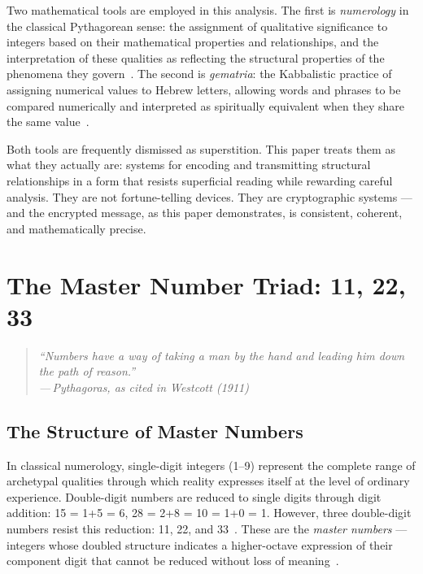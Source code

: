 \documentclass[12pt, a4paper]{article}
\newcommand{\epigraph}[2]{%
  \begin{quote}
    \itshape ``#1''\\[0.3em]
    \normalfont\small\hfill ---\,#2
  \end{quote}
}
\begin{document}
Two mathematical tools are employed in this analysis. The first is
\emph{numerology} in the classical Pythagorean sense: the assignment of
qualitative significance to integers based on their mathematical properties
and relationships, and the interpretation of these qualities as reflecting
the structural properties of the phenomena they
govern~\autocite{westcott1911}. The second is \emph{gematria}: the
Kabbalistic practice of assigning numerical values to Hebrew letters,
allowing words and phrases to be compared numerically and interpreted as
spiritually equivalent when they share the same
value~\autocite{blumenthal2006}.

Both tools are frequently dismissed as superstition. This paper treats them as
what they actually are: systems for encoding and transmitting structural
relationships in a form that resists superficial reading while rewarding
careful analysis. They are not fortune-telling devices. They are
cryptographic systems — and the encrypted message, as this paper demonstrates,
is consistent, coherent, and mathematically precise.

\section{The Master Number Triad: 11, 22, 33}
\label{sec:master}

\epigraph{Numbers have a way of taking a man by the hand and leading him down
the path of reason.}{Pythagoras, as cited in Westcott (1911)}

\subsection{The Structure of Master Numbers}

In classical numerology, single-digit integers (1--9) represent the complete
range of archetypal qualities through which reality expresses itself at the
level of ordinary experience. Double-digit numbers are reduced to single
digits through digit addition: 15 = 1+5 = 6, 28 = 2+8 = 10 = 1+0 = 1.
However, three double-digit numbers resist this reduction: 11, 22, and
33~\autocite{westcott1911}. These are the \emph{master numbers} — integers
whose doubled structure indicates a higher-octave expression of their
component digit that cannot be reduced without loss of
meaning~\autocite{sepharial1912}.
\end{document}
